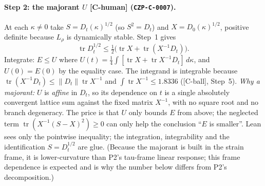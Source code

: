 \documentclass[10pt]{article}
\newcommand{\tier}[1]{\textsf{[#1]}}
\newcommand{\tCh}{\tier{C-human}}
\newcommand{\tCb}{\textcolor{blue!60!black}{\textsf{[C-ball]}}}
\newcommand{\tr}{\operatorname{tr}}
\begin{document}
\paragraph{Step 2: the majorant $U$ \tCh{} (\texttt{CZP-C-0007}).} At each $\kappa\ne0$ take $S=D_t(\kappa)^{1/2}$ (so $S^2=D_t$) and $X=D_0(\kappa)^{1/2}$, positive definite because $L_\rho$ is dynamically stable. Step~1 gives
\[\tr D_t^{1/2}\le\tfrac12\bigl(\tr X+\tr(X^{-1}D_t)\bigr).\]
Integrate: $E\le U$ where $U(t)=\tfrac14\int[\tr X+\tr X^{-1}D_t]\,d\kappa$, and $U(0)=E(0)$ by the equality case. The integrand is integrable because $\tr(X^{-1}D_t)\le\|D_t\|\tr X^{-1}$ and $\int\tr X^{-1}\le1.8336$ (\tCb{}, Step~5).
\emph{Why a majorant:} $U$ is \emph{affine} in $D_t$, so its dependence on $t$ is a single absolutely convergent lattice sum against the fixed matrix $X^{-1}$, with no square root and no branch degeneracy. The price is that $U$ only bounds $E$ from above; the neglected term $\tr(X^{-1}(S-X)^2)\ge0$ can only help the conclusion ``$E$ is smaller''. Lean sees only the pointwise inequality; the integration, integrability and the identification $S=D_t^{1/2}$ are glue. (Because the majorant is built in the strain frame, it is lower-curvature than P2's tau-frame linear response; this frame dependence is expected and is why the number below differs from P2's decomposition.)
\end{document}
